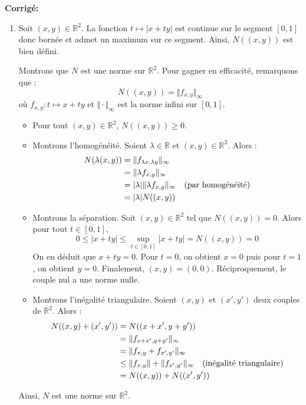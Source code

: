 \documentclass[a4paper,twoside,french,11pt]{VcCours}
\newcommand{\corr}{\textbf{Corrigé:}}
\begin{document}
\corr 

\begin{enumerate}
\item Soit $(x,y) \in \mathbb{R}^2$. La fonction $t \mapsto \vert x+ty \vert$ est continue sur le segment $[0,1]$ donc bornée et admet un maximum sur ce segment. Ainsi, $N((x,y))$ est bien défini.


Montrons que $N$ est une norme sur $\mathbb{R}^2$. Pour gagner en efficacité, remarquons que :
$$ N((x,y)) = \Vert f_{x,y} \Vert_{\infty}$$
où $f_{x,y} : t \mapsto x+ty$ et $\Vert \cdot \Vert_{\infty}$ est la norme infini sur $[0,1]$.

\begin{itemize}
\item Pour tout $(x,y) \in \mathbb{R}^2$, $N((x,y)) \geq 0$.
\item Montrons l'homogénéité. Soient $\lambda \in \mathbb{R}$ et $(x,y) \in \mathbb{R}^2$. Alors :
\begin{align*}
N(\lambda (x,y)) & = \Vert f_{\lambda x, \lambda y} \Vert_{\infty} \\
& = \Vert \lambda f_{x,y} \Vert_{\infty} \\
& = \vert \lambda \vert \Vert \lambda f_{x,y} \Vert_{\infty} \quad \hbox{(par homogénéité)} \\
& = \vert \lambda \vert N((x,y)) 
\end{align*}
\item Montrons la séparation. Soit $(x,y) \in \mathbb{R}^2$ tel que $N((x,y))=0$. Alors pour tout $t \in [0,1]$,
$$ 0 \leq \vert x+ty \vert \leq \sup_{t \in [0,1]} \vert x+ty \vert = N((x,y))=0 $$
On en déduit que $x+ty=0$. Pour $t=0$, on obtient $x=0$ puis pour $t=1$, on obtient $y=0$. Finalement, $(x,y)=(0,0)$. Réciproquement, le couple nul a une norme nulle.
\item Montrons l'inégalité triangulaire. Soient $(x,y)$ et $(x',y')$ deux couples de $\mathbb{R}^2$. Alors :
\begin{align*}
N((x,y)+(x',y')) & = N((x+x',y+y')) \\
& = \Vert f_{x+x',y+y'} \Vert_{\infty} \\
& = \Vert f_{x,y} + f_{x',y'} \Vert_{\infty} \\
& \leq \Vert f_{x,y} \Vert + \Vert f_{x',y'} \Vert_{\infty} \quad \hbox{(inégalité triangulaire)} \\
& = N((x,y))+ N((x',y')) 
\end{align*}
\end{itemize}
Ainsi, $N$ est une norme sur $\mathbb{R}^2$.

\end{enumerate}
\end{document}

